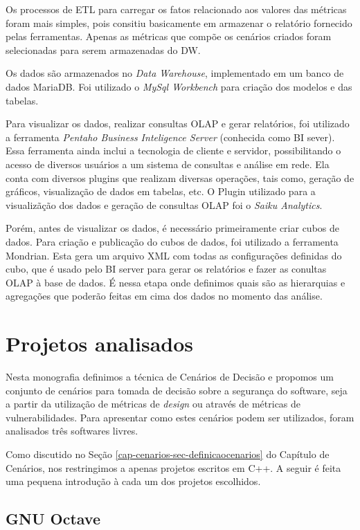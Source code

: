 Os processos de ETL para carregar os fatos relacionado aos valores das métricas foram mais simples, pois consitiu basicamente em armazenar o relatório fornecido pelas ferramentas. Apenas as métricas que compõe os cenários criados foram selecionadas para serem armazenadas do DW.


Os dados são armazenados no \emph{Data Warehouse}, implementado em um banco de dados MariaDB. Foi utilizado o \emph{MySql Workbench} para criação dos modelos e das tabelas.


Para visualizar os dados, realizar consultas OLAP e gerar relatórios, foi utilizado a ferramenta \emph{Pentaho Business Inteligence Server} (conhecida como BI sever). Essa ferramenta ainda inclui a tecnologia de cliente e servidor, possibilitando o acesso de diversos usuários a um sistema de consultas e análise em rede. Ela conta com diversos plugins que realizam diversas operações, tais como, geração de gráficos, visualização de dados em tabelas, etc. O Plugin utilizado para a visualizãção dos dados e geração de consultas OLAP foi o \emph{Saiku Analytics}.

Porém, antes de visualizar os dados, é necessário primeiramente criar cubos de dados. Para criação e publicação do cubos de dados, foi utilizado a ferramenta Mondrian. Esta gera um arquivo XML com todas as configurações definidas do cubo, que é usado pelo BI server para gerar os relatórios e fazer as conultas OLAP à base de dados. É nessa etapa onde definimos quais são as hierarquias e agregações que poderão feitas em cima dos dados no momento das análise.



\section{Projetos analisados}
\label{cap-projects}

Nesta monografia definimos a técnica de Cenários de Decisão e propomos um conjunto de cenários para tomada de decisão sobre a segurança do software, seja a partir da utilização de métricas de \emph{design} ou através de métricas de vulnerabilidades. Para apresentar como estes cenários podem ser utilizados, foram analisados três softwares livres. 

Como discutido no Seção \ref{cap-cenarios-sec-definicaocenarios} do Capítulo de Cenários, nos restringimos a apenas projetos escritos em C++. A seguir é feita uma pequena introdução à cada um dos projetos escolhidos.

\subsection{GNU Octave}
\label{section-octave}

